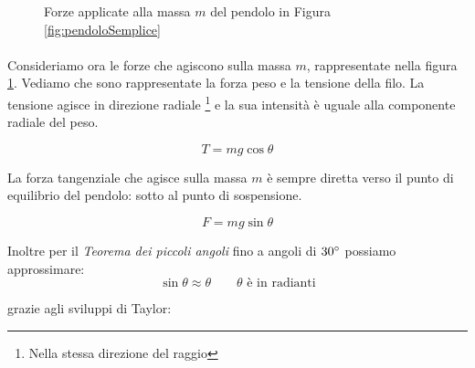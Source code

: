\begin{figure}[H]
    \centering
    \caption{Forze applicate alla massa $m$ del pendolo in Figura \ref{fig:pendoloSemplice}}
    \label{fig:forzePendolo}
\end{figure}

\paragraph{}
Consideriamo ora le forze che agiscono sulla massa $m$, rappresentate nella figura \ref{fig:forzePendolo}.
Vediamo che sono rappresentate la forza peso e la tensione della filo. La tensione agisce in direzione radiale \footnote{Nella stessa direzione del raggio} e la sua intensità è uguale alla componente radiale del peso.

\begin{equation}
    T = mg\cos\theta
\end{equation}

La forza tangenziale che agisce sulla massa $m$ è sempre diretta verso il punto di equilibrio del pendolo: sotto al punto di sospensione.

\begin{equation}
    F = mg\sin\theta
\end{equation}

Inoltre per il \textit{Teorema dei piccoli angoli} fino a angoli di $30^\circ$ possiamo approssimare:
\begin{equation*}
    \sin\theta \approx \theta \qquad \text{$\theta$ è in radianti}
\end{equation*}

grazie agli sviluppi di Taylor:

